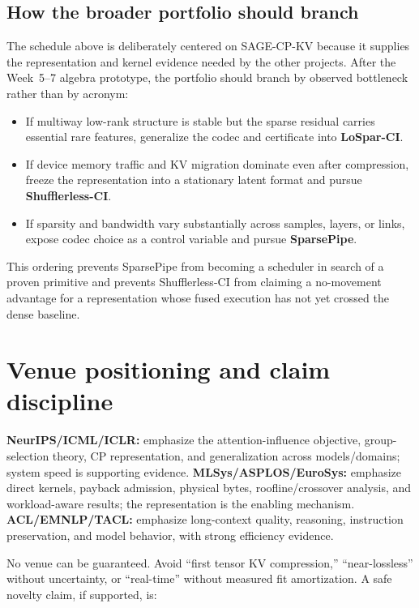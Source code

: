 \documentclass[10pt]{article}
\begin{document}
\subsection{How the broader portfolio should branch}

The schedule above is deliberately centered on SAGE-CP-KV because it supplies the representation
and kernel evidence needed by the other projects. After the Week~5--7 algebra prototype, the
portfolio should branch by observed bottleneck rather than by acronym:
\begin{itemize}[leftmargin=1.5em,itemsep=3pt]
\item If multiway low-rank structure is stable but the sparse residual carries essential rare
features, generalize the codec and certificate into \textbf{LoSpar-CI}.
\item If device memory traffic and KV migration dominate even after compression, freeze the
representation into a stationary latent format and pursue \textbf{Shufflerless-CI}.
\item If sparsity and bandwidth vary substantially across samples, layers, or links, expose codec
choice as a control variable and pursue \textbf{SparsePipe}.
\end{itemize}
This ordering prevents SparsePipe from becoming a scheduler in search of a proven primitive and
prevents Shufflerless-CI from claiming a no-movement advantage for a representation whose fused
execution has not yet crossed the dense baseline.

\section{Venue positioning and claim discipline}

\textbf{NeurIPS/ICML/ICLR:} emphasize the attention-influence objective, group-selection theory,
CP representation, and generalization across models/domains; system speed is supporting evidence.
\textbf{MLSys/ASPLOS/EuroSys:} emphasize direct kernels, payback admission, physical bytes,
roofline/crossover analysis, and workload-aware results; the representation is the enabling
mechanism. \textbf{ACL/EMNLP/TACL:} emphasize long-context quality, reasoning, instruction
preservation, and model behavior, with strong efficiency evidence.

No venue can be guaranteed. Avoid ``first tensor KV compression,'' ``near-lossless'' without
uncertainty, or ``real-time'' without measured fit amortization. A safe novelty claim, if supported,
is:
\end{document}
